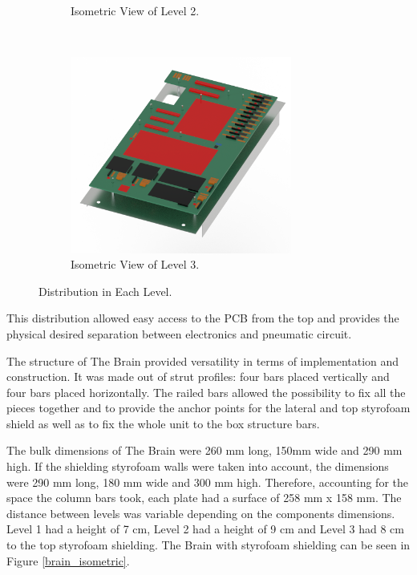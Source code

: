 \begin{figure}[H]
\begin{subfigure}[b]{0.3\textwidth}
    \caption{Isometric View of Level 2.}
    \label{level_2}
    \end{subfigure}
    ~
    \begin{subfigure}[b]{0.3\textwidth}
    \centering
    \includegraphics[width=0.8\textwidth]{4-experiment-design/img/Mechanical/Figure_24c.png}
    \caption{Isometric View of Level 3.}
    \label{level_3}
    \end{subfigure}
    \caption{Distribution in Each Level.}
    \label{fig:The-brain}
\end{figure}


This distribution allowed easy access to the PCB from the top and provides the physical desired separation between electronics and pneumatic circuit.


\smallskip
The structure of The Brain provided versatility in terms of implementation and construction. It was made out of strut profiles: four bars placed vertically and four bars placed horizontally. The railed bars allowed the possibility to fix all the pieces together and to provide the anchor points for the lateral and top styrofoam shield as well as to fix the whole unit to the box structure bars.

\smallskip
The bulk dimensions of The Brain were 260 mm long, 150mm wide and 290 mm high. If the shielding styrofoam walls were taken into account, the dimensions were 290 mm long, 180 mm wide and 300 mm high.
Therefore, accounting for the space the column bars took, each plate had a surface of 258 mm x 158 mm. The distance between levels was variable depending on the components dimensions. Level 1 had a height of 7 cm, Level 2 had a height of 9 cm and Level 3 had 8 cm to the top styrofoam shielding. The Brain with styrofoam shielding can be seen in Figure \ref{brain_isometric}.

